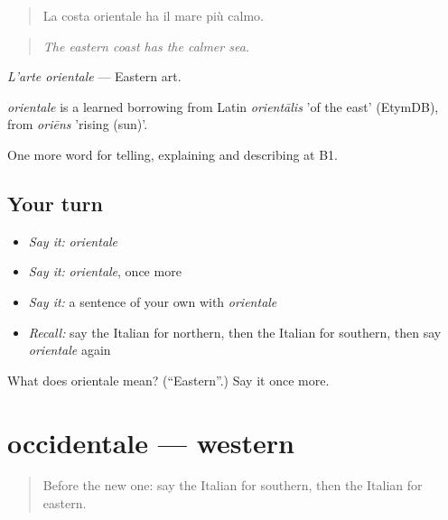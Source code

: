 \begin{quote}
La costa orientale ha il mare più calmo.
\end{quote}

\begin{quote}
\emph{The eastern coast has the calmer sea.}
\end{quote}

\emph{L'arte orientale} — Eastern art.

\begin{cousinweb}
\emph{orientale} is a learned borrowing from Latin \emph{orientālis} 'of the east' (EtymDB), from \emph{oriēns} 'rising (sun)'.
\end{cousinweb}

\begin{grammarlens}[title={What you've built}]
One more word for telling, explaining and describing at B1.
\end{grammarlens}

\subsection*{Your turn}
\begin{itemize}
\raggedright
  \item \emph{Say it:} \emph{orientale}
  \item \emph{Say it:} \emph{orientale}, once more
  \item \emph{Say it:} a sentence of your own with \emph{orientale}
  \item \emph{Recall:} say the Italian for northern, then the Italian for southern, then say \emph{orientale} again
\end{itemize}

\begin{tcolorbox}[breakable,colback=teal!4,colframe=teal!35!black,title={Before you move on}]
What does orientale mean? (\textquotedblleft{}Eastern\textquotedblright{}.) Say it once more.
\end{tcolorbox}
\section[occidentale]{occidentale — western}

\label{lesson:IT-C443-occidentale}



\begin{quote}
Before the new one: say the Italian for southern, then the Italian for eastern.
\end{quote}

